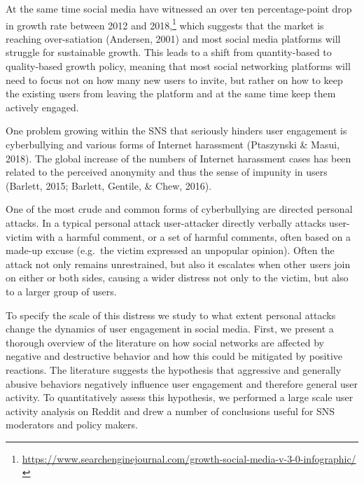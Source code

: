 \documentclass[10pt,dvipsnames]{scrartcl}
\begin{document}
At the same time social media have witnessed an over ten
percentage-point drop in growth rate between 2012 and
2018,\footnote{\url{https://www.searchenginejournal.com/growth-social-media-v-3-0-infographic/}}
which suggests that the market is reaching over-satiation (Andersen,
2001) and most social media platforms will struggle for sustainable
growth. This leads to a shift from quantity-based to quality-based
growth policy, meaning that most social networking platforms will need
to focus not on how many new users to invite, but rather on how to keep
the existing users from leaving the platform and at the same time keep
them actively engaged.

One problem growing within the SNS that seriously hinders user
engagement is cyberbullying and various forms of Internet harassment
(Ptaszynski \& Masui, 2018). The global increase of the numbers of
Internet harassment cases has been related to the perceived anonymity
and thus the sense of impunity in users (Barlett, 2015; Barlett,
Gentile, \& Chew, 2016).

One of the most crude and common forms of cyberbullying are directed
personal attacks. In a typical personal attack user-attacker directly
verbally attacks user-victim with a harmful comment, or a set of harmful
comments, often based on a made-up excuse (e.g.~the victim expressed an
unpopular opinion). Often the attack not only remains unrestrained, but
also it escalates when other users join on either or both sides, causing
a wider distress not only to the victim, but also to a larger group of
users.

To specify the scale of this distress we study to what extent personal
attacks change the dynamics of user engagement in social media. First,
we present a thorough overview of the literature on how social networks
are affected by negative and destructive behavior and how this could be
mitigated by positive reactions. The literature suggests the hypothesis
that aggressive and generally abusive behaviors negatively influence
user engagement and therefore general user activity. To quantitatively
assess this hypothesis, we performed a large scale user activity
analysis on Reddit and drew a number of conclusions useful for SNS
moderators and policy makers.
\end{document}
